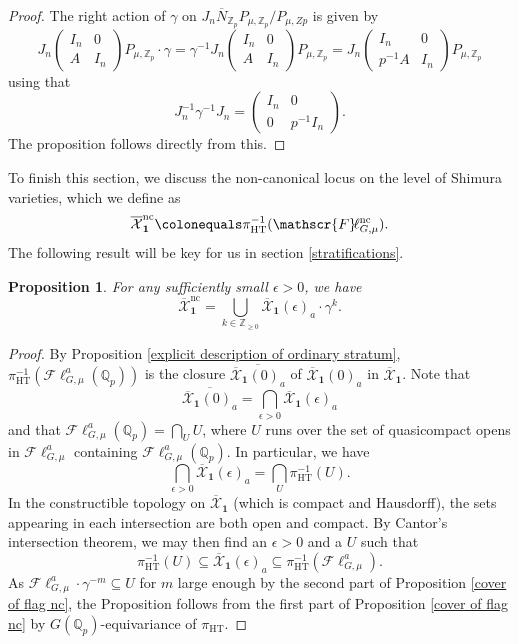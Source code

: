 \documentclass{amsart}
\newtheorem{prop}[subsubsection]{Proposition}
\theoremstyle{remark}
\numberwithin{equation}{subsection}
\newcommand{\Q}{\QQ}
\newcommand{\Z}{\ZZ}
\newcommand{\QQ}{{\mathbb Q}}
\newcommand{\ZZ}{{\mathbb Z}}
\newcommand{\Zp}{\Z_p}
\newcommand{\Qp}{\Q_p}
\newcommand{\HT}{\mathrm{HT}}
\newcommand{\mbf}{\mathbf}
\newcommand{\Fl}{\mathscr{F}\!\ell}
\newcommand{\ocX}{\overline{\mathcal{X}}}
\newcommand{\nc}{\mathrm{nc}}
\newcommand{\ol}{\overline}
\newcommand{\sub}{\subseteq}
\newcommand{\defeq}{\colonequals}
\renewcommand{\(}{\left(}
\renewcommand{\)}{\right)}
\begin{document}
\begin{proof}
The right action of $\gamma$ on $J_n \ol{N}_{\Zp}P_{\mu,\Zp}/P_{\mu,Zp}$ is given by
\[
J_n \begin{pmatrix} I_n & 0 \\ A & I_n \end{pmatrix}P_{\mu,\Zp} \cdot \gamma = \gamma^{-1} J_n \begin{pmatrix} I_n & 0 \\ A & I_n \end{pmatrix}P_{\mu,\Zp} = J_n \begin{pmatrix} I_n & 0 \\ p^{-1}A & I_n \end{pmatrix}P_{\mu,\Zp}
\]
using that
\[
J_n^{-1} \gamma^{-1} J_n = \begin{pmatrix} I_n & 0 \\ 0 & p^{-1}I_n\end{pmatrix}.
\]
The proposition follows directly from this.
\end{proof}

To finish this section, we discuss the non-canonical locus on the level of Shimura varieties, which we define as
\[
\ocX^{\mathrm{nc}}_{\mbf{1}} \defeq \pi_{\HT}^{-1}(\Fl_{G,\mu}^{\nc}).
\]
The following result will be key for us in section \ref{stratifications}.

\begin{prop}\label{expanding the anticanonical locus} For any sufficiently small $\epsilon >0$, we have 
\[
\ocX^{\mathrm{nc}}_{\mbf{1}}= \bigcup_{k\in \Z_{\geq 0}} \ocX_{\mbf{1}}(\epsilon)_{a} \cdot \gamma^{k}.
\]
\end{prop}

\begin{proof}
By Proposition \ref{explicit description of ordinary stratum}, $\pi_{\HT}^{-1}(\Fl^{a}_{G,\mu}(\Qp))$ is the closure $\ol{\ocX_{\mbf{1}}(0)_{a}}$ of $\ocX_{\mbf{1}}(0)_{a}$ in $\ocX_{\mbf{1}}$. Note that 
\[
\ol{\ocX_{\mbf{1}}(0)_{a}} = \bigcap_{\epsilon > 0} \ocX_{\mbf{1}}(\epsilon)_a
\]
and that $\Fl_{G,\mu}^a(\Qp) = \bigcap_U U$, where $U$ runs over the set of quasicompact opens in $\Fl_{G,\mu}^a$ containing $\Fl_{G,\mu}^a(\Qp)$. In particular, we have
\[
\bigcap_{\epsilon > 0} \ocX_{\mbf{1}}(\epsilon)_a = \bigcap_U \pi_{\HT}^{-1}(U).
\]
In the constructible topology on $\ocX_{\mbf{1}}$ (which is compact and Hausdorff), the sets appearing in each intersection are both open and compact. By Cantor's intersection theorem, we may then find an $\epsilon >0$ and a $U$ such that
\[
 \pi^{-1}_{\HT}(U) \sub \ocX_{\mbf{1}}(\epsilon)_{a} \sub \pi_{\HT}^{-1}(\Fl_{G,\mu}^{a}).
\]
As $\Fl_{G,\mu}^{a}\cdot \gamma^{-m} \sub U$ for $m$ large enough by the second part of Proposition \ref{cover of flag nc}, the Proposition follows from the first part of Proposition \ref{cover of flag nc} by $G(\Qp)$-equivariance of $\pi_{\HT}$.
\end{proof}
 
\end{document}
